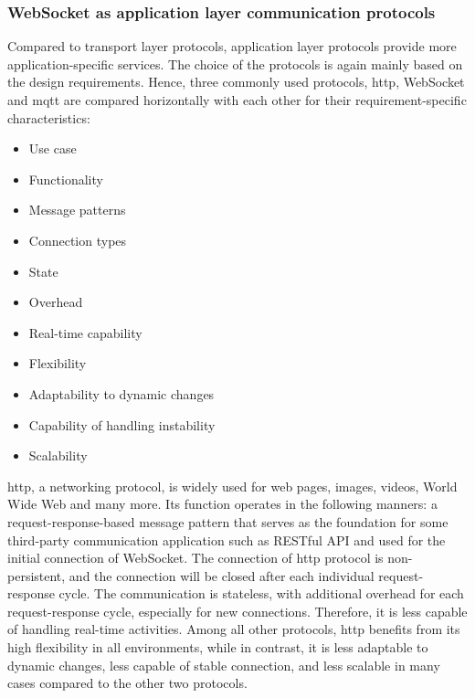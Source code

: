 \subsubsection{WebSocket as application layer communication protocols}
Compared to transport layer protocols, application layer protocols provide more 
application-specific services. The choice of the protocols is again mainly based on the 
design requirements. Hence, three commonly used protocols, \gls{http}, 
WebSocket and \gls{mqtt} are compared horizontally with each other for their 
requirement-specific characteristics:

\begin{itemize}
    \item Use case
    \item Functionality
    \item Message patterns 
    \item Connection types
    \item State
    \item Overhead
    \item Real-time capability
    \item Flexibility
    \item Adaptability to dynamic changes
    \item Capability of handling instability
    \item Scalability
\end{itemize}

\gls{http}, a networking protocol, is widely used for web pages, images, videos, World 
Wide Web and many more. Its function operates in the following manners: a 
request-response-based message pattern that serves as the foundation for some third-party 
communication application such as RESTful API and used for the initial connection of WebSocket. The connection 
of \gls{http} protocol is non-persistent, and the connection will be closed after 
each individual request-response cycle. The communication is stateless, with additional 
overhead for each request-response cycle, especially for new connections. Therefore, 
it is less capable of handling real-time activities. Among all other protocols, 
\gls{http} benefits from its high flexibility in all environments, while in contrast, it is less 
adaptable to dynamic changes, less capable of stable connection, and less scalable 
in many cases compared to the other two protocols. 


